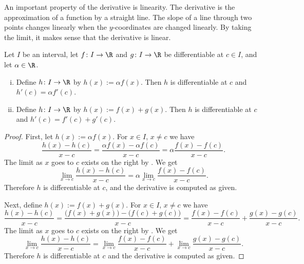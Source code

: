 \documentclass[12pt]{book}
\begin{document}
An important property of the derivative is linearity.
The
derivative is the approximation of a function by a straight line.
The slope of a line through two points changes linearly when the
$y$-coordinates are changed linearly.
By taking the limit,
it makes sense that the derivative is linear.

\begin{prop}
Let $I$ be an interval, let
$f \colon I \to \R$ and $g \colon I \to \R$ be differentiable at $c \in I$,
and let $\alpha \in \R$.
\begin{enumerate}[(i)]
\item
Define $h \colon I \to \R$ by $h(x) := \alpha f(x)$.
Then
$h$ is differentiable at $c$ and
$h'(c) = \alpha f'(c)$.
\item
Define $h \colon I \to \R$ by $h(x) :=  f(x) + g(x)$.
Then
$h$ is differentiable at $c$ and
$h'(c) =  f'(c) + g'(c)$.
\end{enumerate}
\end{prop}

\begin{proof}
First, let $h(x) := \alpha f(x)$.
For $x \in I$, $x \not= c$ we have
\begin{equation*}
\frac{h(x)-h(c)}{x-c} =
\frac{\alpha f(x) - \alpha f(c)}{x-c}
=
\alpha \frac{f(x) - f(c)}{x-c} .
\end{equation*}
The limit as $x$ goes to $c$ exists on the right
by .
We get
\begin{equation*}
\lim_{x\to c}\frac{h(x)-h(c)}{x-c} =
\alpha \lim_{x\to c} \frac{f(x) - f(c)}{x-c} .
\end{equation*}
Therefore $h$ is differentiable at $c$,
and the derivative is computed as given.

Next, define $h(x) := f(x)+g(x)$.
For $x \in I$, $x \not= c$ we have
\begin{equation*}
\frac{h(x)-h(c)}{x-c} =
\frac{\bigl(f(x) + g(x)\bigr) - \bigl(f(c) + g(c)\bigr)}{x-c}
=
\frac{f(x) - f(c)}{x-c}
+
\frac{g(x) - g(c)}{x-c} .
\end{equation*}
The limit as $x$ goes to $c$ exists on the right
by .
We get
\begin{equation*}
\lim_{x\to c}\frac{h(x)-h(c)}{x-c} =
\lim_{x\to c} \frac{f(x) - f(c)}{x-c}
+
\lim_{x\to c}\frac{g(x) - g(c)}{x-c} .
\end{equation*}
Therefore $h$ is differentiable at $c$
and the derivative is computed as given.
\end{proof}
\end{document}
